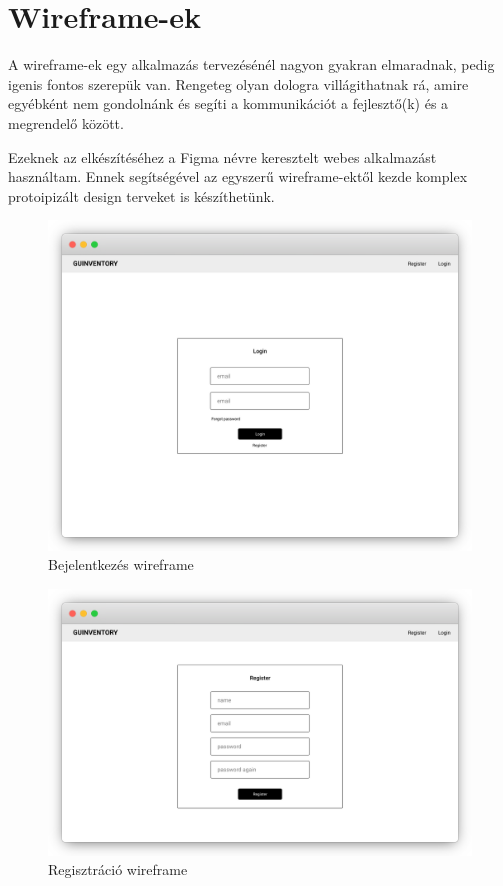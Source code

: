 \chapter{Wireframe-ek}

A wireframe-ek egy alkalmazás tervezésénél nagyon gyakran elmaradnak, pedig igenis fontos szerepük van.
Rengeteg olyan dologra villágithatnak rá, amire egyébként nem gondolnánk és segíti a kommunikációt a fejlesztő(k) és a megrendelő között.

Ezeknek az elkészítéséhez a Figma névre keresztelt webes alkalmazást használtam. 
Ennek segítségével az egyszerű wireframe-ektől kezde komplex protoipizált design terveket is készíthetünk.


\begin{figure}[!ht]
  \centering
  \includegraphics[width=150mm, keepaspectratio]{figures/wireframes/frame_login.png}
  \caption{Bejelentkezés wireframe}
  \label{fig:LoginWireframe}
\end{figure}

\begin{figure}[!ht]
  \centering
  \includegraphics[width=150mm, keepaspectratio]{figures/wireframes/frame_registration.png}
  \caption{Regisztráció wireframe}
  \label{fig:RegistrationWireframe}
\end{figure}

